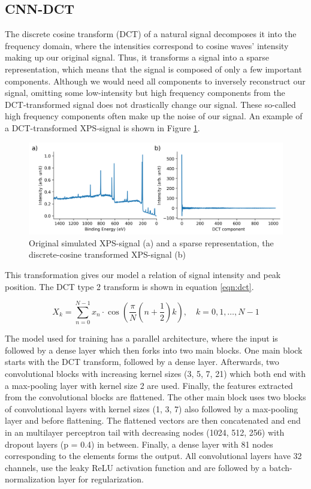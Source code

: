 \subsection{CNN-DCT}
The discrete cosine transform (DCT) of a natural signal decomposes it into the frequency domain, where the intensities correspond to cosine waves' intensity making up our original signal. Thus, it transforms a signal into a sparse representation, which means that the signal is composed of only a few important components. Although we would need all components to inversely reconstruct our signal, omitting some low-intensity but high frequency components from the DCT-transformed signal does not drastically change our signal. These so-called high frequency components often make up the noise of our signal. An example of a DCT-transformed XPS-signal is shown in Figure \ref{fig:dct}.

\begin{figure}[H]
    \centering
    \includegraphics[width=\textwidth]{Figures/dct.png}
    \caption{Original simulated XPS-signal (a) and a sparse representation, the discrete-cosine transformed XPS-signal (b)}
    \label{fig:dct}
\end{figure}

This transformation gives our model a relation of signal intensity and peak position. The DCT type 2 transform is shown in equation \ref{eqn:dct}.

\begin{equation}
\label{eqn:dct}
X_k = \sum_{n=0}^{N-1} x_n \cdot \cos\left(\frac{\pi}{N}\left(n + \frac{1}{2}\right)k\right), \quad k = 0, 1, \ldots, N-1
\end{equation}

The model used for training has a parallel architecture, where the input is followed by a dense layer which then forks into two main blocks. One main block starts with the DCT transform, followed by a dense layer. Afterwards, two convolutional blocks with increasing kernel sizes (3, 5, 7, 21) which both end with a max-pooling layer with kernel size 2 are used. Finally, the features extracted from the convolutional blocks are flattened.
The other main block uses two blocks of convolutional layers with kernel sizes (1, 3, 7) also followed by a max-pooling layer and before flattening. The flattened vectors are then concatenated and end in an multilayer perceptron tail with decreasing nodes (1024, 512, 256) with dropout layers (p = 0.4) in between. Finally, a dense layer with 81 nodes corresponding to the elements forms the output. All convolutional layers have 32 channels, use the leaky ReLU activation function and are followed by a batch-normalization layer for regularization.


